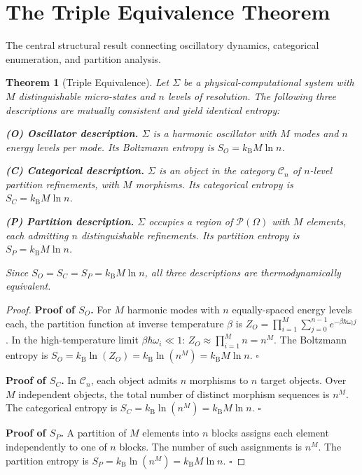 \documentclass[twocolumn,10pt]{article}
\newtheorem{theorem}{Theorem}[section]
\theoremstyle{remark}
\newcommand{\kB}{k_{\mathrm{B}}}
\begin{document}
\section{The Triple Equivalence Theorem}
\label{sec:triple_equiv}

The central structural result connecting oscillatory dynamics, categorical enumeration, and partition analysis.

\begin{theorem}[Triple Equivalence]
\label{thm:triple_equiv}
Let $\Sigma$ be a physical-computational system with $M$ distinguishable micro-states and $n$ levels of resolution.  The following three descriptions are mutually consistent and yield identical entropy:

\textbf{(O) Oscillator description.}  $\Sigma$ is a harmonic oscillator with $M$ modes and $n$ energy levels per mode.  Its Boltzmann entropy is $S_O = \kB M \ln n$.

\textbf{(C) Categorical description.}  $\Sigma$ is an object in the category $\mathcal{C}_n$ of $n$-level partition refinements, with $M$ morphisms.  Its categorical entropy is $S_C = \kB M \ln n$.

\textbf{(P) Partition description.}  $\Sigma$ occupies a region of $\mathcal{P}(\Omega)$ with $M$ elements, each admitting $n$ distinguishable refinements.  Its partition entropy is $S_P = \kB M \ln n$.

Since $S_O = S_C = S_P = \kB M \ln n$, all three descriptions are thermodynamically equivalent.
\end{theorem}

\begin{proof}
\textbf{Proof of $S_O$.}  For $M$ harmonic modes with $n$ equally-spaced energy levels each, the partition function at inverse temperature $\beta$ is $Z_O = \prod_{i=1}^M \sum_{j=0}^{n-1} e^{-\beta \hbar \omega_i j}$.  In the high-temperature limit $\beta \hbar \omega_i \ll 1$: $Z_O \approx \prod_{i=1}^M n = n^M$.  The Boltzmann entropy is $S_O = \kB \ln(Z_O) = \kB \ln(n^M) = \kB M \ln n$.  $\square$

\textbf{Proof of $S_C$.}  In $\mathcal{C}_n$, each object admits $n$ morphisms to $n$ target objects.  Over $M$ independent objects, the total number of distinct morphism sequences is $n^M$.  The categorical entropy is $S_C = \kB \ln(n^M) = \kB M \ln n$.  $\square$

\textbf{Proof of $S_P$.}  A partition of $M$ elements into $n$ blocks assigns each element independently to one of $n$ blocks.  The number of such assignments is $n^M$.  The partition entropy is $S_P = \kB \ln(n^M) = \kB M \ln n$.  $\square$
\end{proof}
\end{document}
